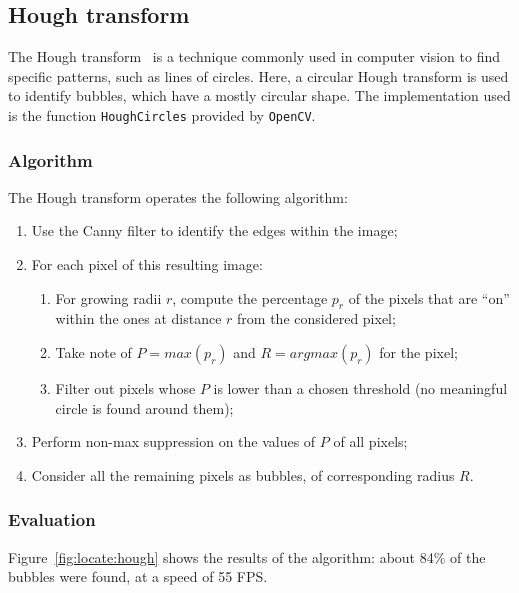 \subsection{Hough transform}
\label{sec:locate:hough}

The Hough transform~\cite{hough} is a technique commonly used in computer vision to find specific patterns, such as lines of circles.
Here, a circular Hough transform is used to identify bubbles, which have a mostly circular shape.
The implementation used is the function \texttt{HoughCircles} provided by \texttt{OpenCV}.

\subsubsection{Algorithm}

The Hough transform operates the following algorithm:
\begin{enumerate}
	\itemsep 0em
	\item Use the Canny filter to identify the edges within the image;
	\item For each pixel of this resulting image:
	      \begin{enumerate}
		      \item For growing radii $r$, compute the percentage $p_r$ of the pixels that are ``on'' within the ones at distance $r$ from the considered pixel;
		      \item Take note of $P = max(p_r)$ and $R = argmax(p_r)$ for the pixel;
		      \item Filter out pixels whose $P$ is lower than a chosen threshold (no meaningful circle is found around them);
	      \end{enumerate}
	\item Perform non-max suppression on the values of $P$ of all pixels;
	\item Consider all the remaining pixels as bubbles, of corresponding radius $R$.
\end{enumerate}

\subsubsection{Evaluation}

Figure~\ref{fig:locate:hough} shows the results of the algorithm: about 84\% of the bubbles were found, at a speed of 55 FPS.

